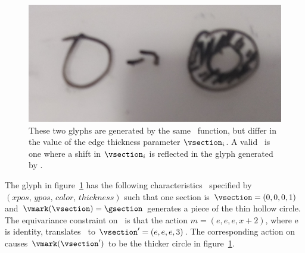 \documentclass[../main.tex]{subfiles}
\begin{document}
\begin{figure}[H]
    \includegraphics[width=\textwidth]{figures/math/diff_type_q.png}
    \caption{These two glyphs are generated by the same \vmark\ function, but differ in the value of the edge thickness parameter $\vsection_i$. A valid \vmark\ is one where a shift in $\vsection_i$ is reflected in the glyph generated by \gsection.}
    \label{fig:artist_mark_change}
\end{figure}

The glyph in figure~\ref{fig:artist_mark_change} has the following characteristics \vfiber\ specified by  $(xpos,\, ypos,\, color,\, thickness)$ such that one section is $\vsection=(0,0,0,1)$ and $\vmark(\vsection) = \gsection$ generates a piece of the thin hollow circle. The equivariance constraint on \vmark\ is that the action $m=(e, e, e, x+2)$, where e is identity, translates \vsection\ to  $\vsection^{\prime}=(e,e,e,3)$. The corresponding action on \gsection causes $\vmark(\vsection^{\prime})$ to be the thicker circle in figure~\ref{fig:artist_mark_change}.
  
\end{document}
